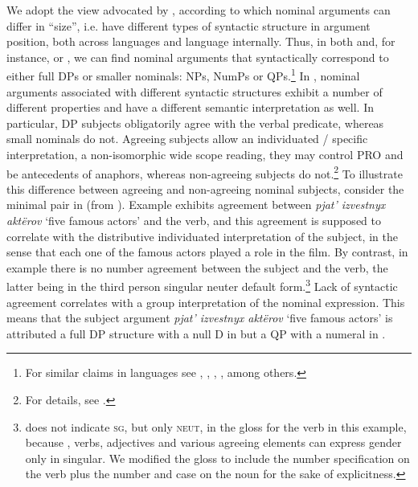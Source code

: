 \documentclass[output=paper
,modfonts
,nonflat]{langsci/langscibook}
\begin{document}
	We adopt the view advocated by \citet{Pereltsvaig2006}, according to which nominal arguments can differ in ``size'', i.e. have different types of syntactic structure in argument position, both across languages and language internally. Thus, in both  and, for instance,  or , we can find nominal arguments that syntactically correspond to either full DPs or smaller nominals: NPs, NumPs or QPs.\footnote{For similar claims in  languages see  \citet{Schmitt1999, Schmitt2003}, \citet{MunnSchmitt2005}, \citet{Dobrovie-Sorin2006}, \citet{Cyrino2015}, among others.} In , nominal arguments associated with different syntactic structures exhibit a number of different properties and have a different semantic interpretation as well. In particular, DP subjects obligatorily agree with the verbal predicate, whereas small nominals do not. Agreeing subjects allow an individuated / specific interpretation, a non-isomorphic wide scope reading, they may control PRO and be antecedents of anaphors, whereas non-agreeing subjects do not.\footnote{For details, see \citet[447]{Pereltsvaig2006}.} To illustrate this difference between agreeing and non-agreeing nominal subjects, consider the minimal pair in  (from \citealt[438--9, ex. 3]{Pereltsvaig2006}). Example  exhibits  agreement between \textit{pjat' izvestnyx akt\"erov} `five famous actors' and the verb, and this agreement is supposed to correlate with the distributive individuated interpretation of the subject, in the sense that each one of the famous actors played a role in the film. By contrast, in example  there is no number agreement between the subject and the verb, the latter being in the third person singular neuter default form.{\footnote{\citet{Pereltsvaig2006} does not indicate \textsc{sg}, but only \textsc{neut}, in the gloss for the verb in this example, because , verbs, adjectives and various agreeing elements can express gender only in singular. We modified the gloss to include the number specification on the verb plus the number and case on the noun for the sake of explicitness.}} Lack of syntactic agreement correlates with a group interpretation of the nominal expression. This means that the subject argument \textit{pjat' izvestnyx akt\"erov} `five famous actors' is attributed a full DP structure with a null D in  but a QP with a numeral in .
	
\end{document}
